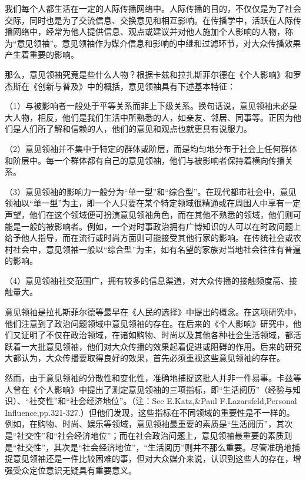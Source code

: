\documentclass[UTF8,12pt]{ctexart}
\numberwithin{equation}{section} %
\numberwithin{figure}{section}
\numberwithin{table}{section}
\begin{document}
	我们每个人都生活在一定的人际传播网络中。人际传播的目的，不仅仅是为了社会交际，同时也是为了交流信息、交换意见和相互影响。在传播学中，活跃在人际传播网络中，经常为他人提供信息、观点或建议并对他人施加个人影响的人物，称为“意见领袖”。意见领袖作为媒介信息和影响的中继和过滤环节，对大众传播效果产生着重要的影响。
	
	那么，意见领袖究竟是些什么人物？根据卡兹和拉扎斯菲尔德在《个人影响》和罗杰斯在《创新与普及》中的概括，意见领袖具有下述基本特征：
	
	（1）与被影响者一般处于平等关系而非上下级关系。换句话说，意见领袖未必是大人物，相反，他们是我们生活中所熟悉的人，如亲友、邻居、同事等。正因为他们是人们所了解和信赖的人，他们的意见和观点也就更具有说服力。
	
	（2）意见领袖并不集中于特定的群体或阶层，而是均匀地分布于社会上任何群体和阶层中。每一个群体都有自己的意见领袖，他们与被影响者保持着横向传播关系。
	
	（3）意见领袖的影响力一般分为“单一型”和“综合型”。在现代都市社会中，意见领袖以“单一型”为主，即一个人只要在某个特定领域很精通或在周围人中享有一定声望，他们在这个领域便可扮演意见领袖角色，而在其他不熟悉的领域，他们则可能是一般的被影响者。例如，一个对时事政治拥有广博知识的人可以在时政问题上给予他人指导，而在流行或时尚方面则可能接受其他行家的影响。在传统社会或农村社会中，意见领袖一般以“综合型”为主，如有名望的家族对当地社会往往有普遍的影响。
	
	（4）意见领袖社交范围广，拥有较多的信息渠道，对大众传播的接触频度高、接触量大。
	
	意见领袖是拉扎斯菲尔德等最早在《人民的选择》中提出的概念。在这项研究中，他们注意到了政治问题领域中意见领袖的存在。在后来的《个人影响》研究中，他们又证明了不仅在政治领域，在诸如购物、时尚以及其他各种社会生活领域，都活跃着一大批意见领袖，他们对大众传播的效果起着促进或阻碍的作用。后来的研究大都认为，大众传播要取得良好的效果，首先必须重视这些意见领袖的存在。
	
	然而，由于意见领袖的分散性和变化性，准确地捕捉这批人并非一件易事。卡兹等人曾在《个人影响》中提出了测定意见领袖的三项指标，即“生活阅历”（经验与知识）、“社交性”和“社会经济地位”。（注：See E.Katz,\&Paul F.Lazarsfeld,Personal Influence,pp.321-327.）但他们发现，这些指标在不同领域的重要性是不一样的。例如，在购物、时尚、娱乐等领域，意见领袖最重要的素质是“生活阅历”，其次是“社交性”和“社会经济地位”；而在社会政治问题上，意见领袖最重要的素质则是“社交性”，其次是“社会经济地位”，“生活阅历”则并不那么重要。尽管准确地捕捉意见领袖还是一件比较困难的事，但对大众媒介来说，认识到这些人的存在，增强受众定位意识无疑具有重要意义。
	
\end{document}
